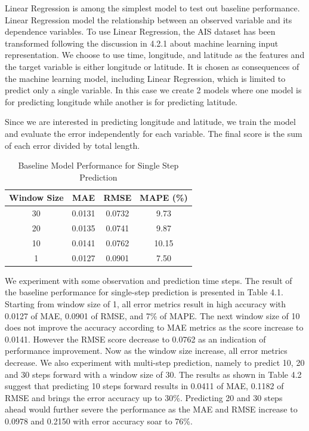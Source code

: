 Linear Regression is among the simplest model to test out baseline performance. Linear Regression model the relationship between an observed variable and its dependence variables. To use Linear Regression, the AIS dataset has been transformed following the discussion in 4.2.1 about machine learning input representation. We choose to use time, longitude, and latitude as the features and the target variable is either longitude or latitude. It is chosen as consequences of the machine learning model, including Linear Regression, which is limited to predict only a single variable. In this case we create 2 models where one model is for predicting longitude while another is for predicting latitude. 

Since we are interested in predicting longitude and latitude, we train the model and evaluate the error independently for each variable. The final score is the sum of each error divided by total length.

\begin{table}[t!]
    \centering
    \caption{Baseline Model Performance for Single Step Prediction}
    \label{tab:baseline}
    \begin{tabular}{c|c|c|c}
      \textbf{Window Size} & \textbf{MAE} & \textbf{RMSE} & \textbf{MAPE (\%)} \\
      \hline
      30 & 0.0131 & 0.0732 & 9.73 \\
      20 & 0.0135 & 0.0741 & 9.87 \\
      10 & 0.0141 & 0.0762 & 10.15 \\
      1 & 0.0127 & 0.0901 & 7.50 \\
    \end{tabular}
\end{table}

We experiment with some observation and prediction time steps. The result of the baseline performance for single-step prediction is presented in Table 4.1. Starting from window size of 1, all error metrics result in high accuracy with 0.0127 of MAE, 0.0901 of RMSE, and 7\% of MAPE. The next window size of 10 does not improve the accuracy according to MAE metrics as the score increase to 0.0141. However the RMSE score decrease to 0.0762 as an indication of performance improvement. Now as the window size increase, all error metrics decrease. We also experiment with multi-step prediction, namely to predict 10, 20 and 30 steps forward with a window size of 30. The results as shown in Table 4.2 suggest that predicting 10 steps forward results in 0.0411 of MAE, 0.1182 of RMSE and brings the error accuracy up to 30\%. Predicting 20 and 30 steps ahead would further severe the performance as the MAE and RMSE increase to 0.0978 and 0.2150 with error accuracy soar to 76\%.

